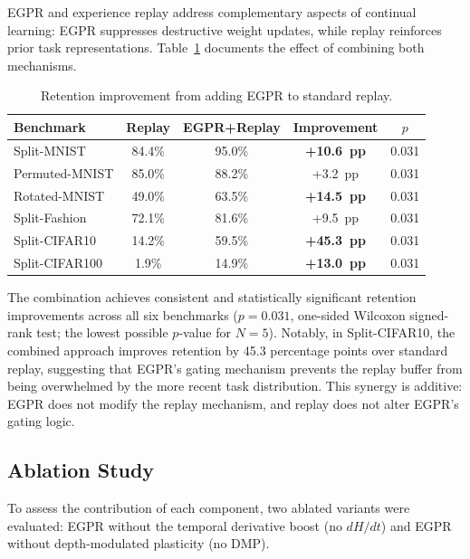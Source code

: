 \documentclass[11pt,a4paper]{article}
\begin{document}
EGPR and experience replay address complementary aspects of continual learning: EGPR suppresses destructive weight updates, while replay reinforces prior task representations. Table~\ref{tab:synergy} documents the effect of combining both mechanisms.

\begin{table}[htbp]
\centering
\caption{Retention improvement from adding EGPR to standard replay.}
\label{tab:synergy}
\begin{tabular}{lcccc}
\toprule
Benchmark & Replay & EGPR+Replay & Improvement & $p$ \\
\midrule
Split-MNIST & 84.4\% & 95.0\% & \textbf{+10.6~pp} & 0.031 \\
Permuted-MNIST & 85.0\% & 88.2\% & +3.2~pp & 0.031 \\
Rotated-MNIST & 49.0\% & 63.5\% & \textbf{+14.5~pp} & 0.031 \\
Split-Fashion & 72.1\% & 81.6\% & +9.5~pp & 0.031 \\
Split-CIFAR10 & 14.2\% & 59.5\% & \textbf{+45.3~pp} & 0.031 \\
Split-CIFAR100 & 1.9\% & 14.9\% & \textbf{+13.0~pp} & 0.031 \\
\bottomrule
\end{tabular}
\end{table}

The combination achieves consistent and statistically significant retention improvements across all six benchmarks ($p = 0.031$, one-sided Wilcoxon signed-rank test; the lowest possible $p$-value for $N=5$). Notably, in Split-CIFAR10, the combined approach improves retention by 45.3 percentage points over standard replay, suggesting that EGPR's gating mechanism prevents the replay buffer from being overwhelmed by the more recent task distribution. This synergy is additive: EGPR does not modify the replay mechanism, and replay does not alter EGPR's gating logic.

\subsection{Ablation Study}

To assess the contribution of each component, two ablated variants were evaluated: EGPR without the temporal derivative boost (no $dH/dt$) and EGPR without depth-modulated plasticity (no DMP).
\end{document}
